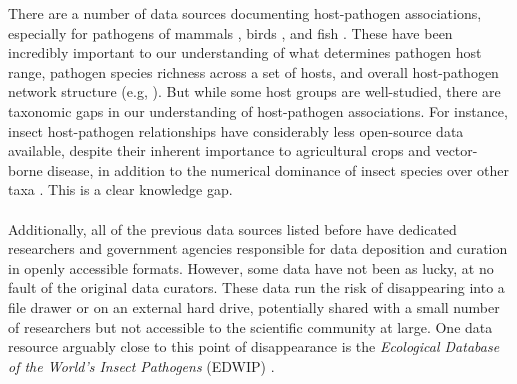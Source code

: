 \documentclass[12pt]{article}
\begin{document}
There are a number of data sources documenting host-pathogen associations, especially for pathogens of mammals \citep{gibb2021, patrick2017}, birds \citep{bensch2009}, and fish \citep{fishpest}. These have been incredibly important to our understanding of what determines pathogen host range, pathogen species richness across a set of hosts, and overall host-pathogen network structure (e.g, \citep{dallas2018, carlson2020}). But while some host groups are well-studied, there are taxonomic gaps in our understanding of host-pathogen associations. For instance, insect host-pathogen relationships have considerably less open-source data available, despite their inherent importance to agricultural crops and vector-borne disease, in addition to the numerical dominance of insect species over other taxa \citep{stork2015}. This is a clear knowledge gap. 






\paragraph*{}
Additionally, all of the previous data sources listed before have dedicated researchers and government agencies responsible for data deposition and curation in openly accessible formats. However, some data have not been as lucky, at no fault of the original data curators. These data run the risk of disappearing into a file drawer or on an external hard drive, potentially shared with a small number of researchers but not accessible to the scientific community at large. One data resource arguably close to this point of disappearance is the \textit{Ecological Database of the World's Insect Pathogens} (EDWIP) \citep{onstad1997}. 



\end{document}
